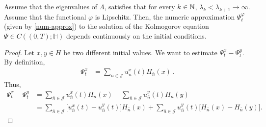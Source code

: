 \documentclass[review,onefignum,onetabnum]{siamart190516}
\begin{document}
\begin{theorem}
    \label{thm:ic_continuity}
    Assume that the eigenvalues of $\Lambda$, satisfies that for every 
    $k\in{\mathbb N}$,
    $\lambda_k<\lambda_{k+1}\rightarrow \infty $. Assume that
    the functional $ \varphi$ is Lipschitz.
    Then, the numeric approximation $\Psi_t^\varphi$ (given by 
    \eqref{num-approx})
    to the solution of the Kolmogorov equation
    ${\Psi\in C((0,T); \mathbb{H})}$ depends continuously on the initial
    conditions.
\end{theorem}
\begin{proof}
Let $x,y\in H$ be two different initial values. We want to estimate
$\Psi_t^x-\Psi_t^y$. By definition,
\begin{align}
    \Psi_t^x
        &= \sum_{\bar n\in \mathcal{J}}
            u_{\bar n} ^ x(t) H_{\bar n}(x) \ .
\end{align}
Thus,
%
\begin{equation}
    \label{s3.4}
    \begin{aligned}
        \Psi_t^x-\Psi_t^y
        &=
            \sum_{\bar n\in \mathcal{J}}
                u_{\bar n}^x(t)H_{\bar n}(x)
            -
            \sum_{\bar n\in \mathcal{J}}
                u_{\bar n}^y(t)H_{\bar n}(y)
       \\
        &=
            \sum_{\bar n\in \mathcal{J}}
                \Big[ u_{\bar n}^x(t )- u_{\bar n}^y(t)
                \Big]H_{\bar n}(x)
            +
            \sum_{\bar n\in \mathcal{J}}
                u_{\bar n}^y(t)
                \Big[
                    H_{\bar n}(x) - H_{\bar n}(y)
                \Big].
    \end{aligned}
\end{equation}


\end{proof}
\end{document}
